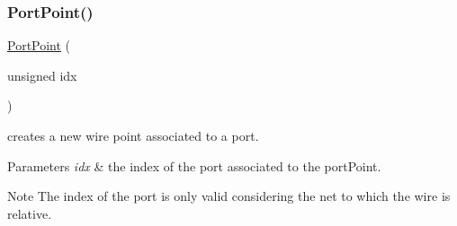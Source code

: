 \subsubsection{\texorpdfstring{Port\+Point()}{PortPoint()}}
{\footnotesize\ttfamily \hyperlink{class_open_chams_1_1_port_point}{Port\+Point} (\begin{DoxyParamCaption}\item[{unsigned}]{idx }\end{DoxyParamCaption})\hspace{0.3cm}{\ttfamily [inline]}}



creates a new wire point associated to a port. 


\begin{DoxyParams}{Parameters}
{\em idx} & the index of the port associated to the port\+Point.\\
\hline
\end{DoxyParams}
\begin{DoxyNote}{Note}
The index of the port is only valid considering the net to which the wire is relative. 
\end{DoxyNote}
